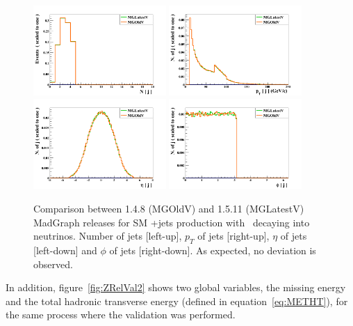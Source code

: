 \begin{figure}[!Hhtbp]
  \begin{center}
    \includegraphics[width=0.45\textwidth]{figs/ZjetsRelVal0.png}
    \includegraphics[width=0.45\textwidth]{figs/ZjetsRelVal1.png}
    \includegraphics[width=0.45\textwidth]{figs/ZjetsRelVal2.png}
    \includegraphics[width=0.45\textwidth]{figs/ZjetsRelVal3.png}
    \caption{Comparison between 1.4.8 (MGOldV) and 1.5.11 (MGLatestV) MadGraph releases for SM \Z+jets production with \Z~decaying into neutrinos. Number of jets [left-up], $p_{T}$ of jets [right-up], $\eta$ of jets [left-down] and $\phi$ of jets [right-down]. As expected, no deviation is observed.}
    \label{fig:ZRelVal1}
  \end{center}
\end{figure}

In addition, figure~\ref{fig:ZRelVal2} shows two global variables, the missing energy and the total hadronic transverse energy (defined in equation~\ref{eq:METHT}), for the same process where the validation was performed.

